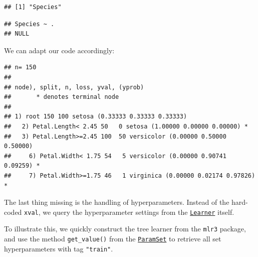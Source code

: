 \documentclass[]{article}
\newenvironment{Shaded}{\begin{snugshade}}{\end{snugshade}}
\newcommand{\DataTypeTok}[1]{\textcolor[rgb]{0.13,0.29,0.53}{#1}}
\newcommand{\DecValTok}[1]{\textcolor[rgb]{0.00,0.00,0.81}{#1}}
\newcommand{\KeywordTok}[1]{\textcolor[rgb]{0.13,0.29,0.53}{\textbf{#1}}}
\newcommand{\NormalTok}[1]{#1}
\newcommand{\OperatorTok}[1]{\textcolor[rgb]{0.81,0.36,0.00}{\textbf{#1}}}
\newcommand{\StringTok}[1]{\textcolor[rgb]{0.31,0.60,0.02}{#1}}
\renewenvironment{Shaded} {\begin{snugshade}\small} {\end{snugshade}}
\begin{document}
\begin{verbatim}
## [1] "Species"
\end{verbatim}

\begin{Shaded}
\end{Shaded}

\begin{verbatim}
## Species ~ .
## NULL
\end{verbatim}

We can adapt our code accordingly:

\begin{Shaded}
\end{Shaded}

\begin{verbatim}
## n= 150 
## 
## node), split, n, loss, yval, (yprob)
##       * denotes terminal node
## 
## 1) root 150 100 setosa (0.33333 0.33333 0.33333)  
##   2) Petal.Length< 2.45 50   0 setosa (1.00000 0.00000 0.00000) *
##   3) Petal.Length>=2.45 100  50 versicolor (0.00000 0.50000 0.50000)  
##     6) Petal.Width< 1.75 54   5 versicolor (0.00000 0.90741 0.09259) *
##     7) Petal.Width>=1.75 46   1 virginica (0.00000 0.02174 0.97826) *
\end{verbatim}

The last thing missing is the handling of hyperparameters.
Instead of the hard-coded \texttt{xval}, we query the hyperparameter settings from the \href{https://mlr3.mlr-org.com/reference/Learner.html}{\texttt{Learner}} itself.

To illustrate this, we quickly construct the tree learner from the \texttt{mlr3} package, and use the method \texttt{get\_value()} from the \href{https://paradox.mlr-org.com/reference/ParamSet.html}{\texttt{ParamSet}} to retrieve all set hyperparameters with tag \texttt{"train"}.

\begin{Shaded}
\end{Shaded}
\end{document}
